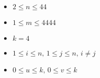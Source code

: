\begin{itemize}
\tightlist
\item $2 \le n \le 44$
\item $1 \le m \le 4444$
\item $k = 4$
\item $1 \le i \le n ,\,1\le j \le n ,\, i \ne j$
\item $0 \le u \le k ,\,0\le v \le k$
\end{itemize}
